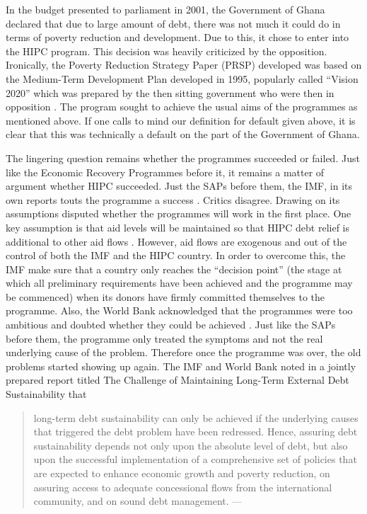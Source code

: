 \documentclass[12pt, a4paper]{article}
\begin{document}
	In the budget presented to parliament in 2001, the Government of Ghana declared that due to large amount of debt, there was not much it could do in terms of poverty reduction and development. Due to this, it chose to enter into the HIPC program. This decision was heavily criticized by the opposition. Ironically, the Poverty Reduction Strategy Paper (PRSP) developed was based on the Medium-Term Development Plan developed in 1995, popularly called ``Vision 2020'' which was prepared by the then sitting government who were then in opposition \cite{osei2001hipc}. The program sought to achieve the usual aims of the programmes as mentioned above. If one calls to mind our definition for default given above, it is clear that this was technically a default on the part of the Government of Ghana.
	
	The lingering question remains whether the programmes succeeded or failed. Just like the Economic Recovery Programmes before it, it remains a matter of argument whether HIPC succeeded. Just the SAPs before them, the IMF, in its own reports touts the programme a success \cite{Debora17}. Critics disagree. Drawing on its assumptions  disputed whether the programmes will work in the first place.  One key assumption  is that aid levels will be maintained so that HIPC debt relief is additional to other aid flows \cite{World2003}. However, aid flows are exogenous and out of the control of both the IMF and the HIPC country. In order to overcome this, the IMF make sure that a country only reaches the ``decision point'' (the stage at which all preliminary requirements have been achieved and the programme may be commenced) when its donors have firmly committed themselves to the programme. Also, the World Bank acknowledged that the programmes were too ambitious and doubted whether they could be achieved \cite{World2003}. Just like the SAPs before them, the programme only treated the symptoms and not the real underlying cause of the problem. Therefore once the programme was over, the old problems started showing up again.
	The IMF and World Bank noted in a jointly prepared report titled The Challenge of Maintaining Long-Term External Debt Sustainability that 
	
	\begin{quotation}
		long-term debt sustainability can only be achieved if the underlying causes that triggered the debt problem have been redressed. Hence, assuring debt sustainability depends not only upon the absolute level of debt, but also upon the successful implementation of a comprehensive set of policies that are expected to enhance economic growth and poverty reduction, on assuring access to adequate concessional flows from the international community, and on sound debt management.
		\hspace{1em plus 1fill}---\cite{THECHALLENGE}
	\end{quotation}
\end{document}
